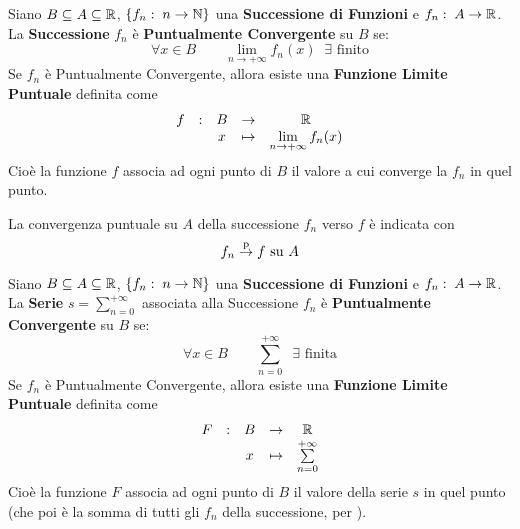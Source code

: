 \begin{definition}
	\label{def:succ_punt_conv}
	Siano $B \subseteq A \subseteq \mathbb{R}$, $\left\{f_n:\; n \to \mathbb{N}\right\}$ una \textbf{Successione di Funzioni} e $f_n:\; A \to \mathbb{R}$.\\
	La \textbf{Successione} $f_n$ è \textbf{Puntualmente Convergente} su $B$ se:
	\[\forall x \in B \qquad \lim\limits_{n \to +\infty} f_n(x) \;\; \exists \text{ finito}\]
	Se $f_n$ è Puntualmente Convergente, allora esiste una \textbf{Funzione Limite Puntuale} definita come
	\[\begin{array}{ccccc} {f} & : & {B} & \to & {\mathbb{R}} \\ & & {x} & \mapsto & {\lim\limits_{n \to +\infty} f_n(x)} \\ \end{array}\]
	Cioè la funzione $f$ associa ad ogni punto di $B$ il valore a cui converge la $f_n$ in quel punto.

	\vspace*{\baselineskip}
	La convergenza puntuale su $A$ della successione $f_n$ verso $f$ è indicata con
	\[f_n \overset{\text{p}}{\to} f \text{ su } A\]
\end{definition}
\begin{definition}
	Siano $B \subseteq A \subseteq \mathbb{R}$, $\left\{f_n:\; n \to \mathbb{N}\right\}$ una \textbf{Successione di Funzioni} e $f_n:\; A \to \mathbb{R}$.\\
	La \textbf{Serie} $s =\sum\limits_{n = 0}^{+\infty}$ associata alla Successione $f_n$ è \textbf{Puntualmente Convergente} su $B$ se:
	\[\forall x \in B \qquad \sum\limits_{n = 0}^{+\infty} \;\; \exists \text{ finita}\]
	Se $f_n$ è Puntualmente Convergente, allora esiste una \textbf{Funzione Limite Puntuale} definita come
	\[\begin{array}{ccccc} {F} & : & {B} & \to & {\mathbb{R}} \\ & & {x} & \mapsto & {\sum\limits_{n = 0}^{+\infty}} \\ \end{array}\]
	Cioè la funzione $F$ associa ad ogni punto di $B$ il valore della serie $s$ in quel punto (che poi è la somma di tutti gli $f_n$ della successione, per ).
\end{definition}
